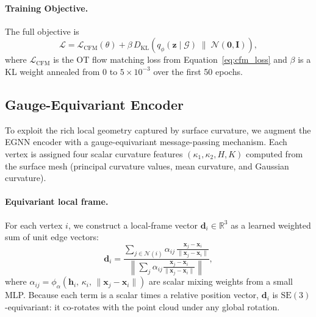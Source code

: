 \documentclass{article}
\newcommand{\R}{\mathbb{R}}
\newcommand{\SE}{\mathrm{SE}(3)}
\begin{document}
\paragraph{Training Objective.}
The full objective is
\begin{equation}
    \mathcal{L} = \mathcal{L}_\text{CFM}(\theta)
                + \beta\, D_\text{KL}\!\left(
                    q_\phi(\mathbf{z} \mid \mathcal{G})
                    \;\|\;
                    \mathcal{N}(\mathbf{0}, \mathbf{I})
                  \right),
    \label{eq:total_loss}
\end{equation}
where $\mathcal{L}_\text{CFM}$ is the OT flow matching loss from
Equation~\eqref{eq:cfm_loss} and $\beta$ is a KL weight annealed from
0 to $5 \times 10^{-3}$ over the first 50 epochs.

\subsection{Gauge-Equivariant Encoder}
\label{sec:gauge_method}

To exploit the rich local geometry captured by surface curvature, we
augment the EGNN encoder with a gauge-equivariant message-passing
mechanism.
Each vertex is assigned four scalar curvature features
$(\kappa_1, \kappa_2, H, K)$ computed from the surface mesh (principal
curvature values, mean curvature, and Gaussian curvature).

\paragraph{Equivariant local frame.}
For each vertex $i$, we construct a local-frame vector
$\mathbf{d}_i \in \R^3$ as a learned weighted sum of unit edge vectors:
\begin{equation}
    \mathbf{d}_i = \frac{\sum_{j \in \mathcal{N}(i)}
        \alpha_{ij}\,
        \frac{\mathbf{x}_j - \mathbf{x}_i}{\|\mathbf{x}_j - \mathbf{x}_i\|}}
    {\left\|\sum_{j}\alpha_{ij}\frac{\mathbf{x}_j - \mathbf{x}_i}{\|\mathbf{x}_j - \mathbf{x}_i\|}\right\|},
    \label{eq:frame}
\end{equation}
where $\alpha_{ij} = \phi_\alpha(\mathbf{h}_i,\, \kappa_i,\, \|\mathbf{x}_j
- \mathbf{x}_i\|)$ are scalar mixing weights from a small MLP.
Because each term is a scalar times a relative position vector,
$\mathbf{d}_i$ is $\SE$-equivariant: it co-rotates with the point cloud
under any global rotation.
\end{document}
